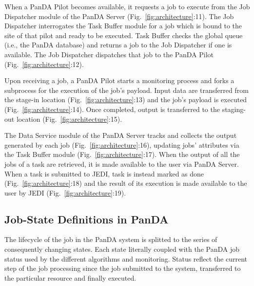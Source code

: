 When a PanDA Pilot becomes available, it requests a job to execute from the
Job Dispatcher module of the PanDA Server (Fig.~\ref{fig:architecture}:11).
The Job Dispatcher interrogates the Task Buffer module for a job which is
bound to the site of that pilot and ready to be executed. Task Buffer checks
the global queue (i.e., the PanDA database) and returns a job to the Job
Dispatcher if one is available. The Job Dispatcher dispatches that job to the
PanDA Pilot (Fig.~\ref{fig:architecture}:12).

Upon receiving a job, a PanDA Pilot starts a monitoring process and forks a
subprocess for the execution of the job's payload. Input data are transferred
from the stage-in location (Fig.~\ref{fig:architecture}:13) and the job's
payload is executed (Fig.~\ref{fig:architecture}:14). Once completed, output
is transferred to the staging-out location (Fig.~\ref{fig:architecture}:15).

The Data Service module of the PanDA Server tracks and collects the output
generated by each job (Fig.~\ref{fig:architecture}:16), updating jobs'
attributes via the Task Buffer module (Fig.~\ref{fig:architecture}:17). When
the output of all the jobs of a task are retrieved, it is made available to
the user via PanDA Server. When a task is submitted to JEDI, task is instead
marked as done (Fig.~\ref{fig:architecture}:18) and the result of its
execution is made available to the user by JEDI
(Fig.~\ref{fig:architecture}:19).

\subsection{Job-State Definitions in PanDA}
\label{subsec:jobstatedefs}

The lifecycle of the job in the PanDA system is splitted to the series of
consequently changing states. Each state literally coupled with the PanDA job
status used by the different algorithms and monitoring. Status reflect the
current step of the job processing since the job submitted to the system,
transferred to the particular resource and finally executed.

